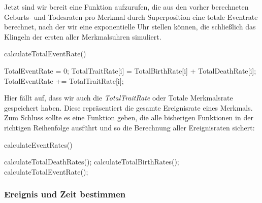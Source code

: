 \documentclass[11pt, a4paper, german]{article}
\theoremstyle{plain}
\begin{document}
	 Jetzt sind wir bereit eine Funktion aufzurufen, die aus den vorher berechneten Geburts- und Todesraten pro Merkmal durch Superposition eine totale Eventrate berechnet, nach der wir eine exponentielle Uhr stellen können, die schließlich das Klingeln der ersten aller Merkmalsuhren simuliert.
	 \begin{algorithm}[H]
 		\caption{calculateTotalEventRate()}
 		\begin{algorithmic}[1]
 			\State TotalEventRate = 0;
 				\State TotalTraitRate[i] = TotalBirthRate[i] + TotalDeathRate[i];
 				\State TotalEventRate += TotalTraitRate[i];
 			\EndFor
 		\end{algorithmic}
 	\end{algorithm}
 	Hier fällt auf, dass wir auch die \textit{TotalTraitRate} oder Totale Merkmalsrate gespeichert haben. Diese repräsentiert die gesamte Ereignisrate eines Merkmals.\\
 	Zum Schluss sollte es eine Funktion geben, die alle bisherigen Funktionen in der richtigen Reihenfolge ausführt und so die Berechnung aller Ereignisraten sichert:
 	\begin{algorithm}[H]
 		\caption{calculateEventRates()}
 		\begin{algorithmic}[1]
 			\State calculateTotalDeathRates();
 			\State calculateTotalBirthRates();
 			\State calculateTotalEventRate();
 		\end{algorithmic}
 	\end{algorithm}
	
	\subsubsection{Ereignis und Zeit bestimmen}
	
\end{document}
